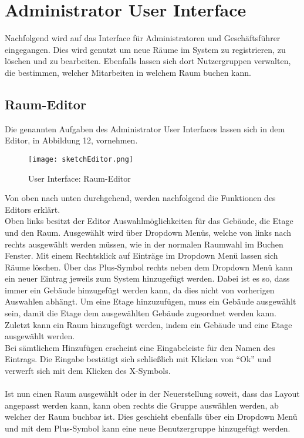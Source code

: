 \vspace{5cm}

\section{Administrator User Interface}

Nachfolgend wird auf das Interface für Administratoren und Geschäftsführer eingegangen. 
Dies wird genutzt um neue Räume im System zu registrieren, zu löschen und zu bearbeiten.
Ebenfalls lassen sich dort Nutzergruppen verwalten, die bestimmen, welcher Mitarbeiten in welchem Raum buchen kann. 

\newpage
\subsection{Raum-Editor}
Die genannten Aufgaben des Administrator User Interfaces lassen sich in dem Editor, in Abbildung 12, vornehmen.

\begin{figure}[!h]
  \centering
  \texttt{[image: sketchEditor.png]}
  \caption{User Interface: Raum-Editor}
  \label{fig:sketch_RaumEditor}
\end{figure}

Von oben nach unten durchgehend, werden nachfolgend die Funktionen des Editors erklärt.
\\
Oben links besitzt der Editor Auswahlmöglichkeiten für das Gebäude, die Etage und den Raum.
Ausgewählt wird über Dropdown Menüs, welche von links nach rechts ausgewählt werden müssen, wie in der normalen Raumwahl im Buchen Fenster.
Mit einem Rechtsklick auf Einträge im Dropdown Menü lassen sich Räume löschen.
Über das Plus-Symbol rechts neben dem Dropdown Menü kann ein neuer Eintrag jeweils zum System hinzugefügt werden.
Dabei ist es so, dass immer ein Gebäude hinzugefügt werden kann, da dies nicht von vorherigen Auswahlen abhängt. 
Um eine Etage hinzuzufügen, muss ein Gebäude ausgewählt sein, damit die Etage dem ausgewählten Gebäude zugeordnet werden kann.
Zuletzt kann ein Raum hinzugefügt werden, indem ein Gebäude und eine Etage ausgewählt werden.
\\
Bei sämtlichem Hinzufügen erscheint eine Eingabeleiste für den Namen des Eintrags.
Die Eingabe bestätigt sich schließlich mit Klicken von "`Ok"' und verwerft sich mit dem Klicken des X-Symbols.

\paragraph{} Ist nun einen Raum ausgewählt oder in der Neuerstellung soweit, dass das Layout angepasst werden kann, kann oben rechts die Gruppe auswählen werden, ab welcher der Raum buchbar ist.
Dies geschieht ebenfalls über ein Dropdown Menü und mit dem Plus-Symbol kann eine neue Benutzergruppe hinzugefügt werden. 

